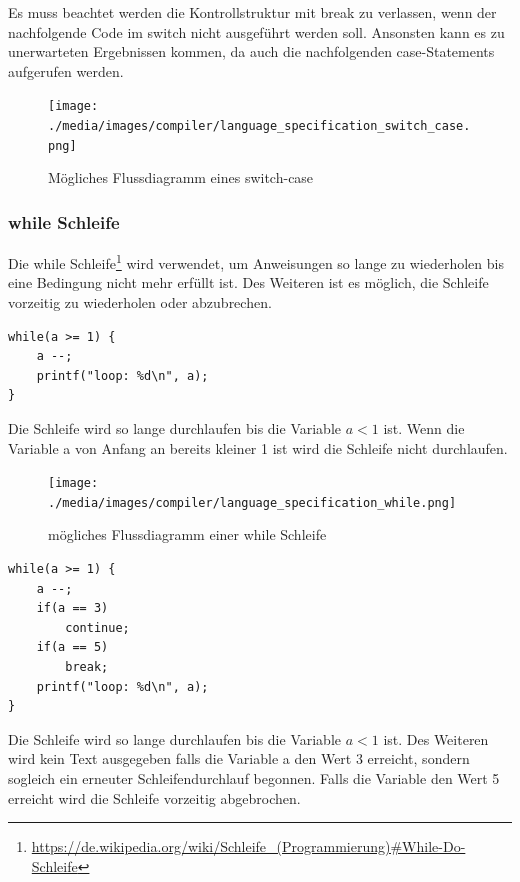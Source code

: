 Es muss beachtet werden die Kontrollstruktur mit break zu verlassen, wenn der nachfolgende Code im switch nicht ausgef\"uhrt werden soll. Ansonsten kann es zu unerwarteten Ergebnissen kommen, da auch die nachfolgenden case-Statements aufgerufen werden.

\begin{figure}[h]
\centering
\texttt{[image: ./media/images/compiler/language\_specification\_switch\_case.png]}
\caption{M\"ogliches Flussdiagramm eines switch-case}
\label{language_specification_switch_case}
\end{figure}

\newpage
\subsubsection{while Schleife}

Die while Schleife\footnote{\url{https://de.wikipedia.org/wiki/Schleife_(Programmierung)\#While-Do-Schleife}} wird verwendet, um Anweisungen so lange zu wiederholen bis eine Bedingung nicht mehr erf\"ullt ist. Des Weiteren ist es m\"oglich, die Schleife vorzeitig zu wiederholen oder abzubrechen. 


\begin{lstlisting}[language=CMM]
while(a >= 1) {
	a --;
	printf("loop: %d\n", a);
}
\end{lstlisting}

Die Schleife wird so lange durchlaufen bis die Variable $a < 1$ ist. Wenn die Variable a von Anfang an bereits kleiner 1 ist wird die Schleife nicht durchlaufen.

\begin{figure}[h]
\centering
\texttt{[image: ./media/images/compiler/language\_specification\_while.png]}
\caption{m\"ogliches Flussdiagramm einer while Schleife}
\label{language_specification_while}
\end{figure}


\begin{lstlisting}[language=CMM]
while(a >= 1) {
	a --;
	if(a == 3)
		continue;
	if(a == 5)
		break;
	printf("loop: %d\n", a);
}
\end{lstlisting}

Die Schleife wird so lange durchlaufen bis die Variable $a < 1$ ist. Des Weiteren wird kein Text ausgegeben falls die Variable a den Wert 3 erreicht, sondern sogleich ein erneuter Schleifendurchlauf begonnen. Falls die Variable den Wert 5 erreicht wird die Schleife vorzeitig abgebrochen.

